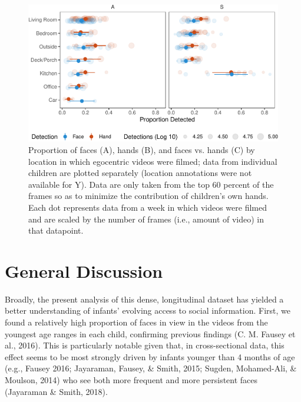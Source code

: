 \documentclass[10pt, letterpaper]{article}
\newenvironment{CodeChunk}{}{}
\begin{document}
\begin{CodeChunk}
\begin{figure}[h]

{\centering \includegraphics{figs/DetByLocation-1} 

}

\caption[Proportion of faces (A),  hands (B), and faces vs]{Proportion of faces (A),  hands (B), and faces vs. hands  (C) by location in which egocentric videos were filmed; data from individual children are plotted separately (location annotations were not available for Y). Data are only taken from the top 60 percent of the frames so as to minimize the contribution of children’s own hands. Each dot represents data from a week in which videos were filmed and are scaled by the number of frames (i.e., amount of video) in that datapoint.}\label{fig:DetByLocation}
\end{figure}
\end{CodeChunk}

\section{General Discussion}\label{general-discussion}

Broadly, the present analysis of this dense, longitudinal dataset has
yielded a better understanding of infants' evolving access to social
information. First, we found a relatively high proportion of faces in
view in the videos from the youngest age ranges in each child,
confirming previous findings (C. M. Fausey et al., 2016). This is
particularly notable given that, in cross-sectional data, this effect
seems to be most strongly driven by infants younger than 4 months of age
(e.g., Fausey 2016; Jayaraman, Fausey, \& Smith, 2015; Sugden,
Mohamed-Ali, \& Moulson, 2014) who see both more frequent and more
persistent faces (Jayaraman \& Smith, 2018).
\end{document}
